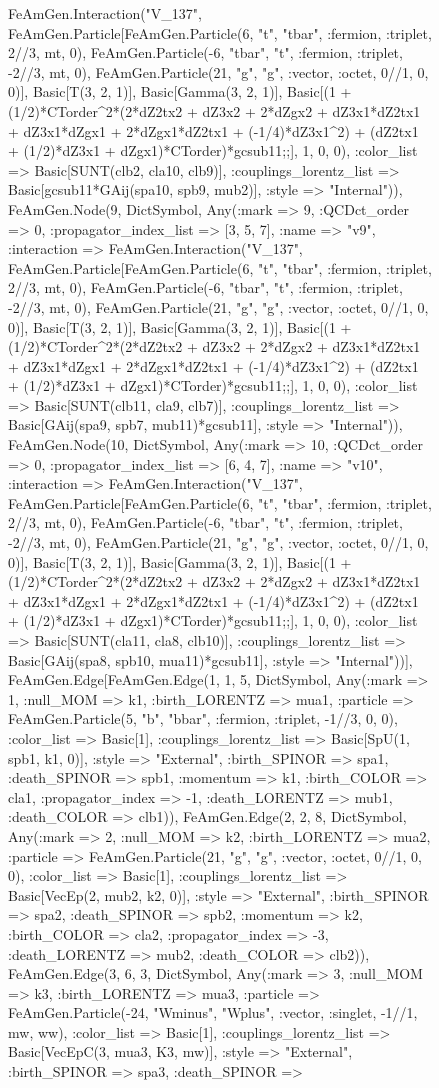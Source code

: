 \documentclass{revtex4}
\begin{document}
\begin{figure}[!htb]
\begin{center}
{FeAmGen.Interaction("V_137", FeAmGen.Particle[FeAmGen.Particle(6, "t", "tbar", :fermion, :triplet, 2//3, mt, 0), FeAmGen.Particle(-6, "tbar", "t", :fermion, :triplet, -2//3, mt, 0), FeAmGen.Particle(21, "g", "g", :vector, :octet, 0//1, 0, 0)], Basic[T(3, 2, 1)], Basic[Gamma(3, 2, 1)], Basic[(1 + (1/2)*CTorder^2*(2*dZ2tx2 + dZ3x2 + 2*dZgx2 + dZ3x1*dZ2tx1 + dZ3x1*dZgx1 + 2*dZgx1*dZ2tx1 + (-1/4)*dZ3x1^2) + (dZ2tx1 + (1/2)*dZ3x1 + dZgx1)*CTorder)*gcsub11;;], 1, 0, 0), :color_list => Basic[SUNT(clb2, cla10, clb9)], :couplings_lorentz_list => Basic[gcsub11*GAij(spa10, spb9, mub2)], :style => "Internal")), FeAmGen.Node(9, Dict{Symbol, Any}(:mark => 9, :QCDct_order => 0, :propagator_index_list => [3, 5, 7], :name => "v9", :interaction => FeAmGen.Interaction("V_137", FeAmGen.Particle[FeAmGen.Particle(6, "t", "tbar", :fermion, :triplet, 2//3, mt, 0), FeAmGen.Particle(-6, "tbar", "t", :fermion, :triplet, -2//3, mt, 0), FeAmGen.Particle(21, "g", "g", :vector, :octet, 0//1, 0, 0)], Basic[T(3, 2, 1)], Basic[Gamma(3, 2, 1)], Basic[(1 + (1/2)*CTorder^2*(2*dZ2tx2 + dZ3x2 + 2*dZgx2 + dZ3x1*dZ2tx1 + dZ3x1*dZgx1 + 2*dZgx1*dZ2tx1 + (-1/4)*dZ3x1^2) + (dZ2tx1 + (1/2)*dZ3x1 + dZgx1)*CTorder)*gcsub11;;], 1, 0, 0), :color_list => Basic[SUNT(clb11, cla9, clb7)], :couplings_lorentz_list => Basic[GAij(spa9, spb7, mub11)*gcsub11], :style => "Internal")), FeAmGen.Node(10, Dict{Symbol, Any}(:mark => 10, :QCDct_order => 0, :propagator_index_list => [6, 4, 7], :name => "v10", :interaction => FeAmGen.Interaction("V_137", FeAmGen.Particle[FeAmGen.Particle(6, "t", "tbar", :fermion, :triplet, 2//3, mt, 0), FeAmGen.Particle(-6, "tbar", "t", :fermion, :triplet, -2//3, mt, 0), FeAmGen.Particle(21, "g", "g", :vector, :octet, 0//1, 0, 0)], Basic[T(3, 2, 1)], Basic[Gamma(3, 2, 1)], Basic[(1 + (1/2)*CTorder^2*(2*dZ2tx2 + dZ3x2 + 2*dZgx2 + dZ3x1*dZ2tx1 + dZ3x1*dZgx1 + 2*dZgx1*dZ2tx1 + (-1/4)*dZ3x1^2) + (dZ2tx1 + (1/2)*dZ3x1 + dZgx1)*CTorder)*gcsub11;;], 1, 0, 0), :color_list => Basic[SUNT(cla11, cla8, clb10)], :couplings_lorentz_list => Basic[GAij(spa8, spb10, mua11)*gcsub11], :style => "Internal"))], FeAmGen.Edge[FeAmGen.Edge(1, 1, 5, Dict{Symbol, Any}(:mark => 1, :null_MOM => k1, :birth_LORENTZ => mua1, :particle => FeAmGen.Particle(5, "b", "bbar", :fermion, :triplet, -1//3, 0, 0), :color_list => Basic[1], :couplings_lorentz_list => Basic[SpU(1, spb1, k1, 0)], :style => "External", :birth_SPINOR => spa1, :death_SPINOR => spb1, :momentum => k1, :birth_COLOR => cla1, :propagator_index => -1, :death_LORENTZ => mub1, :death_COLOR => clb1)), FeAmGen.Edge(2, 2, 8, Dict{Symbol, Any}(:mark => 2, :null_MOM => k2, :birth_LORENTZ => mua2, :particle => FeAmGen.Particle(21, "g", "g", :vector, :octet, 0//1, 0, 0), :color_list => Basic[1], :couplings_lorentz_list => Basic[VecEp(2, mub2, k2, 0)], :style => "External", :birth_SPINOR => spa2, :death_SPINOR => spb2, :momentum => k2, :birth_COLOR => cla2, :propagator_index => -3, :death_LORENTZ => mub2, :death_COLOR => clb2)), FeAmGen.Edge(3, 6, 3, Dict{Symbol, Any}(:mark => 3, :null_MOM => k3, :birth_LORENTZ => mua3, :particle => FeAmGen.Particle(-24, "Wminus", "Wplus", :vector, :singlet, -1//1, mw, ww), :color_list => Basic[1], :couplings_lorentz_list => Basic[VecEpC(3, mua3, K3, mw)], :style => "External", :birth_SPINOR => spa3, :death_SPINOR => }
\end{center}
\end{figure}
\end{document}
